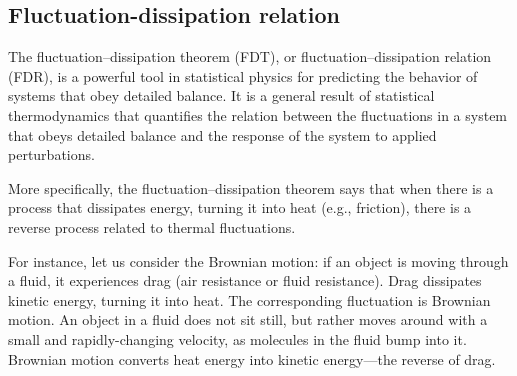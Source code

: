 \documentclass[../../Main/Main.tex]{subfiles}
\begin{document}
\subsection{Fluctuation-dissipation relation}
The fluctuation–dissipation theorem (FDT), or fluctuation–dissipation relation (FDR), is a powerful tool in statistical physics for predicting the behavior of systems that obey detailed balance. It is a general result of statistical thermodynamics that quantifies the relation between the fluctuations in a system that obeys detailed balance and the response of the system to applied perturbations.

More specifically, the fluctuation–dissipation theorem says that when there is a process that dissipates energy, turning it into heat (e.g., friction), there is a reverse process related to thermal fluctuations.

For instance, let us consider the Brownian motion: if an object is moving through a fluid, it experiences drag (air resistance or fluid resistance). Drag dissipates kinetic energy, turning it into heat. The corresponding fluctuation is Brownian motion. An object in a fluid does not sit still, but rather moves around with a small and rapidly-changing velocity, as molecules in the fluid bump into it. Brownian motion converts heat energy into kinetic energy—the reverse of drag.
\end{document}
